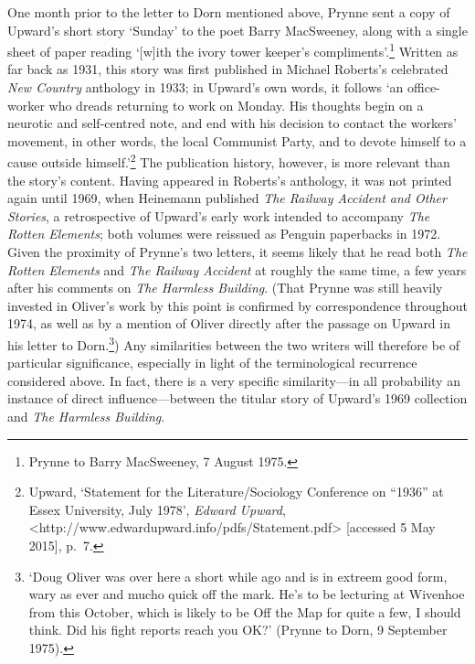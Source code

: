 \documentclass[]{article}
\begin{document}
One month prior to the letter to Dorn mentioned above, Prynne sent a
copy of Upward's short story `Sunday' to the poet Barry MacSweeney,
along with a single sheet of paper reading `{[}w{]}ith the ivory tower
keeper's compliments'.\footnote{Prynne to Barry MacSweeney, 7 August
  1975.} Written as far back as 1931, this story was first published in
Michael Roberts's celebrated \emph{New Country} anthology in 1933; in
Upward's own words, it follows `an office-worker who dreads returning to
work on Monday. His thoughts begin on a neurotic and self-centred note,
and end with his decision to contact the workers' movement, in other
words, the local Communist Party, and to devote himself to a cause
outside himself.'\footnote{Upward, `Statement for the
  Literature/Sociology Conference on ``1936'' at Essex University, July
  1978', \emph{Edward Upward},
  \textless{}http://www.edwardupward.info/pdfs/Statement.pdf\textgreater{}
  {[}accessed 5 May 2015{]}, p.~7.} The publication history, however, is
more relevant than the story's content. Having appeared in Roberts's
anthology, it was not printed again until 1969, when Heinemann published
\emph{The Railway Accident and Other Stories}, a retrospective of
Upward's early work intended to accompany \emph{The Rotten Elements};
both volumes were reissued as Penguin paperbacks in 1972. Given the
proximity of Prynne's two letters, it seems likely that he read both
\emph{The Rotten Elements} and \emph{The Railway Accident} at roughly
the same time, a few years after his comments on \emph{The Harmless
Building}. (That Prynne was still heavily invested in Oliver's work by
this point is confirmed by correspondence throughout 1974, as well as by
a mention of Oliver directly after the passage on Upward in his letter
to Dorn.\footnote{`Doug Oliver was over here a short while ago and is in
  extreem good form, wary as ever and mucho quick off the mark. He's to
  be lecturing at Wivenhoe from this October, which is likely to be Off
  the Map for quite a few, I should think. Did his fight reports reach
  you OK?' (Prynne to Dorn, 9 September 1975).}) Any similarities
between the two writers will therefore be of particular significance,
especially in light of the terminological recurrence considered above.
In fact, there is a very specific similarity---in all probability an
instance of direct influence---between the titular story of Upward's
1969 collection and \emph{The Harmless Building}.
\end{document}
